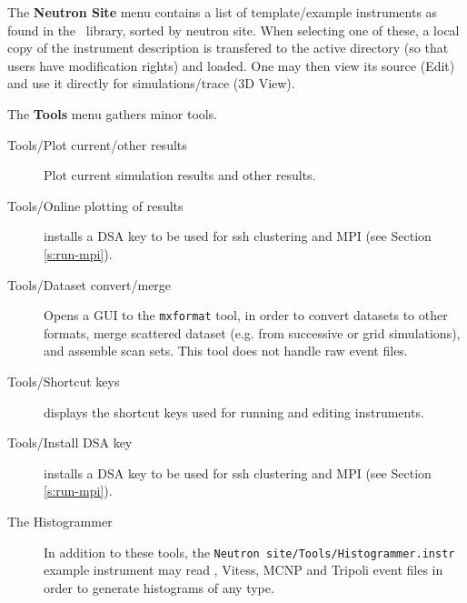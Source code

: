 \noindent The {\bf Neutron Site} menu contains a list of
template/example instruments as found in the \MCX\ library, sorted by
neutron site. When selecting one of these, a local copy of the
instrument description is transfered to the active directory (so that
users have modification rights) and loaded. One may then view its source (Edit) and use it directly for simulations/trace (3D View).


\noindent The {\bf Tools} menu gathers minor tools.
\begin{description}
\item[Tools/Plot current/other results] Plot current simulation results and other results.
\item[Tools/Online plotting of results] installs a DSA key to be used for ssh clustering and MPI (see Section \ref{s:run-mpi}).
\item[Tools/Dataset convert/merge] Opens a GUI to the \verb+mxformat+ tool, in order to convert datasets to other formats, merge scattered dataset (e.g. from successive or grid simulations), and assemble scan sets. This tool does not handle raw event files.
\item[Tools/Shortcut keys] displays the shortcut keys used for running and editing instruments.
\item[Tools/Install DSA key] installs a DSA key to be used for ssh clustering and MPI (see Section \ref{s:run-mpi}).
\item[The Histogrammer] In addition to these tools, the \verb+Neutron site/Tools/Histogrammer.instr+ example instrument may read \MCX , Vitess, MCNP and Tripoli event files in order to generate histograms of any type.
\end{description}


